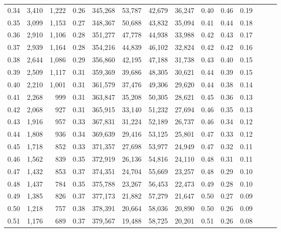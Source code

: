 \begin{tabular}{rrrrrrrrrrrrrr}
0.34 &   3,410 &  1,222 &  0.26 &  345,268 &   53,787 &  42,679 &  36,247 &  0.40 &  0.46 &      0.19 \\
0.35 &   3,099 &  1,153 &  0.27 &  348,367 &   50,688 &  43,832 &  35,094 &  0.41 &  0.44 &      0.18 \\
0.36 &   2,910 &  1,106 &  0.28 &  351,277 &   47,778 &  44,938 &  33,988 &  0.42 &  0.43 &      0.17 \\
0.37 &   2,939 &  1,164 &  0.28 &  354,216 &   44,839 &  46,102 &  32,824 &  0.42 &  0.42 &      0.16 \\
0.38 &   2,644 &  1,086 &  0.29 &  356,860 &   42,195 &  47,188 &  31,738 &  0.43 &  0.40 &      0.15 \\
0.39 &   2,509 &  1,117 &  0.31 &  359,369 &   39,686 &  48,305 &  30,621 &  0.44 &  0.39 &      0.15 \\
0.40 &   2,210 &  1,001 &  0.31 &  361,579 &   37,476 &  49,306 &  29,620 &  0.44 &  0.38 &      0.14 \\
0.41 &   2,268 &    999 &  0.31 &  363,847 &   35,208 &  50,305 &  28,621 &  0.45 &  0.36 &      0.13 \\
0.42 &   2,068 &    927 &  0.31 &  365,915 &   33,140 &  51,232 &  27,694 &  0.46 &  0.35 &      0.13 \\
0.43 &   1,916 &    957 &  0.33 &  367,831 &   31,224 &  52,189 &  26,737 &  0.46 &  0.34 &      0.12 \\
0.44 &   1,808 &    936 &  0.34 &  369,639 &   29,416 &  53,125 &  25,801 &  0.47 &  0.33 &      0.12 \\
0.45 &   1,718 &    852 &  0.33 &  371,357 &   27,698 &  53,977 &  24,949 &  0.47 &  0.32 &      0.11 \\
0.46 &   1,562 &    839 &  0.35 &  372,919 &   26,136 &  54,816 &  24,110 &  0.48 &  0.31 &      0.11 \\
0.47 &   1,432 &    853 &  0.37 &  374,351 &   24,704 &  55,669 &  23,257 &  0.48 &  0.29 &      0.10 \\
0.48 &   1,437 &    784 &  0.35 &  375,788 &   23,267 &  56,453 &  22,473 &  0.49 &  0.28 &      0.10 \\
0.49 &   1,385 &    826 &  0.37 &  377,173 &   21,882 &  57,279 &  21,647 &  0.50 &  0.27 &      0.09 \\
0.50 &   1,218 &    757 &  0.38 &  378,391 &   20,664 &  58,036 &  20,890 &  0.50 &  0.26 &      0.09 \\
0.51 &   1,176 &    689 &  0.37 &  379,567 &   19,488 &  58,725 &  20,201 &  0.51 &  0.26 &      0.08 \\

\end{tabular}
